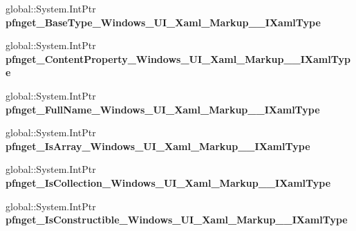 \begin{DoxyCompactItemize}
global\+::\+System.\+Int\+Ptr {\bfseries pfnget\+\_\+\+Base\+Type\+\_\+\+Windows\+\_\+\+U\+I\+\_\+\+Xaml\+\_\+\+Markup\+\_\+\+\_\+\+I\+Xaml\+Type}
\item 
\mbox{\label{struct_windows_1_1_u_i_1_1_xaml_1_1_markup_1_1_i_xaml_type_____impl_1_1_vtbl_a1420a7c2f41d75f6c1e4c862fae5886f}} 
global\+::\+System.\+Int\+Ptr {\bfseries pfnget\+\_\+\+Content\+Property\+\_\+\+Windows\+\_\+\+U\+I\+\_\+\+Xaml\+\_\+\+Markup\+\_\+\+\_\+\+I\+Xaml\+Type}
\item 
\mbox{\label{struct_windows_1_1_u_i_1_1_xaml_1_1_markup_1_1_i_xaml_type_____impl_1_1_vtbl_af77b724d351ee2e9b04a1056b4679706}} 
global\+::\+System.\+Int\+Ptr {\bfseries pfnget\+\_\+\+Full\+Name\+\_\+\+Windows\+\_\+\+U\+I\+\_\+\+Xaml\+\_\+\+Markup\+\_\+\+\_\+\+I\+Xaml\+Type}
\item 
\mbox{\label{struct_windows_1_1_u_i_1_1_xaml_1_1_markup_1_1_i_xaml_type_____impl_1_1_vtbl_ae87c47c4c7f7d0be2185b74619c09ffa}} 
global\+::\+System.\+Int\+Ptr {\bfseries pfnget\+\_\+\+Is\+Array\+\_\+\+Windows\+\_\+\+U\+I\+\_\+\+Xaml\+\_\+\+Markup\+\_\+\+\_\+\+I\+Xaml\+Type}
\item 
\mbox{\label{struct_windows_1_1_u_i_1_1_xaml_1_1_markup_1_1_i_xaml_type_____impl_1_1_vtbl_a5ca8ad7d66dd8aea028c0bdfcce6af38}} 
global\+::\+System.\+Int\+Ptr {\bfseries pfnget\+\_\+\+Is\+Collection\+\_\+\+Windows\+\_\+\+U\+I\+\_\+\+Xaml\+\_\+\+Markup\+\_\+\+\_\+\+I\+Xaml\+Type}
\item 
\mbox{\label{struct_windows_1_1_u_i_1_1_xaml_1_1_markup_1_1_i_xaml_type_____impl_1_1_vtbl_a5da03d21965173981268e4246930847d}} 
global\+::\+System.\+Int\+Ptr {\bfseries pfnget\+\_\+\+Is\+Constructible\+\_\+\+Windows\+\_\+\+U\+I\+\_\+\+Xaml\+\_\+\+Markup\+\_\+\+\_\+\+I\+Xaml\+Type}
\item 
\mbox{\label{struct_windows_1_1_u_i_1_1_xaml_1_1_markup_1_1_i_xaml_type_____impl_1_1_vtbl_afb706287ae88482ef22b76fad49b5a52}} 

\end{DoxyCompactItemize}
